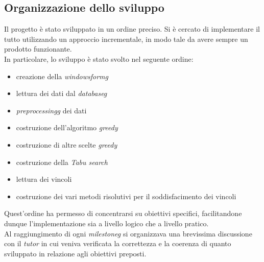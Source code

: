 \subsection{Organizzazione dello sviluppo}
\label{sec:organizzazione-sviluppo}
\noindent Il progetto è stato sviluppato in un
ordine preciso. Si è cercato di implementare il tutto utilizzando
un approccio incrementale, in modo tale da avere
sempre un prodotto funzionante.\\
In particolare, lo sviluppo è stato svolto nel seguente ordine:
\begin{itemize}
    \item creazione della \textit{\gls{windowsformg}}
    \item lettura dei dati dal \textit{\gls{databaseg}}
    \item \textit{\gls{preprocessingg}} dei dati
    \item costruzione dell'algoritmo \textit{greedy}
    \item costruzione di altre scelte \textit{greedy}
    \item costruzione della \textit{Tabu search}
    \item lettura dei vincoli
    \item costruzione dei vari metodi risolutivi
    per il soddisfacimento dei vincoli
\end{itemize}

\noindent Quest'ordine ha permesso di concentrarsi su obiettivi specifici,
facilitandone dunque l'implementazione sia a livello logico che a livello pratico.\\

\noindent Al raggiungimento di ogni \textit{\gls{milestoneg}} si
organizzava una brevissima discussione con il \textit{tutor}
in cui veniva verificata la correttezza e la coerenza di quanto
sviluppato in relazione agli obiettivi preposti.
